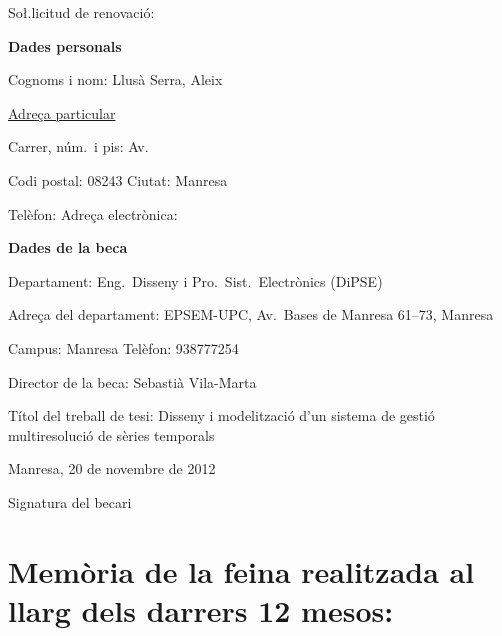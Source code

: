 \mbox{}\vspace{1cm}

So\l.licitud de renovació:

\vfill

\textbf{Dades personals}

Cognoms i nom: Llusà Serra, Aleix

\underline{Adreça particular}

Carrer, núm.\ i pis: Av.\ 

Codi postal: 08243   Ciutat: Manresa

Telèfon:       Adreça electrònica: 


\vspace{2cm}


\textbf{Dades de la beca}

Departament: Eng.\ Disseny i Pro.\ Sist.\ Electrònics (DiPSE)

Adreça del departament: EPSEM-UPC, Av.\ Bases de Manresa 61--73, Manresa

Campus: Manresa  Telèfon: 938777254

Director de la beca: Sebastià Vila-Marta

Títol del treball de tesi: Disseny i modelització d'un sistema de gestió multiresolució de sèries temporals


\vfill

Manresa, 20 de novembre de 2012

\vspace{2cm}
\todo{}

Signatura del becari





\newpage

\renewcommand*\descriptionlabel[1]{\hspace\labelsep\normalfont #1:}

\section*{Memòria de la feina realitzada al llarg dels darrers 12 mesos:}





